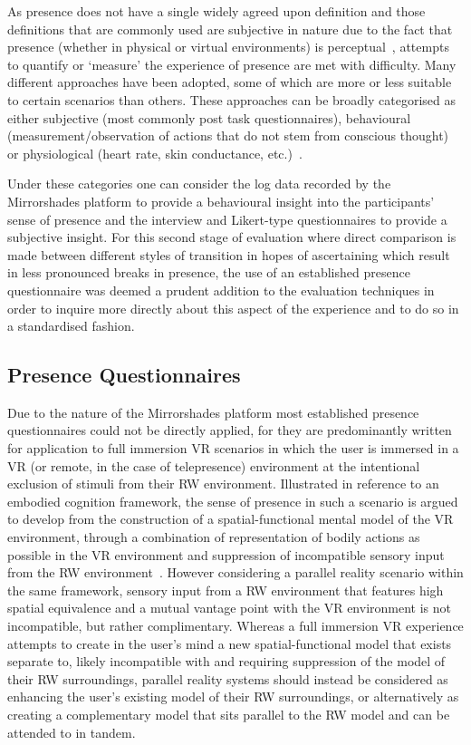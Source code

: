 As presence does not have a single widely agreed upon definition and those definitions that are commonly used are subjective in nature due to the fact that presence (whether in physical or virtual environments) is perceptual~\cite{Waterworth2014}, attempts to quantify or `measure' the experience of presence are met with difficulty. Many different approaches have been adopted, some of which are more or less suitable to certain scenarios than others. These approaches can be broadly categorised as either subjective (most commonly post task questionnaires), behavioural (measurement/observation of actions that do not stem from conscious thought) or physiological (heart rate, skin conductance, etc.)~\cite{Insko2003}.

Under these categories one can consider the log data recorded by the Mirrorshades platform to provide a behavioural insight into the participants' sense of presence and the interview and Likert-type questionnaires to provide a subjective insight. For this second stage of evaluation where direct comparison is made between different styles of transition in hopes of ascertaining which result in less pronounced breaks in presence, the use of an established presence questionnaire was deemed a prudent addition to the evaluation techniques in order to inquire more directly about this aspect of the experience and to do so in a standardised fashion.


\subsection{Presence Questionnaires}

Due to the nature of the Mirrorshades platform most established presence questionnaires could not be directly applied,  for they are predominantly written for application to full immersion VR scenarios in which the user is immersed in a VR (or remote, in the case of telepresence) environment at the intentional exclusion of stimuli from their RW environment. Illustrated in reference to an embodied cognition framework, the sense of presence in such a scenario is argued to develop from the construction of a spatial-functional mental model of the VR environment, through a combination of representation of bodily actions as possible in the VR environment and suppression of incompatible sensory input from the RW environment~\cite{Schubert2001}. However considering a parallel reality scenario within the same framework, sensory input from a RW environment that features high spatial equivalence and a mutual vantage point with the VR environment is not incompatible, but rather complimentary. Whereas a full immersion VR experience attempts to create in the user's mind a new spatial-functional model that exists separate to, likely incompatible with and requiring suppression of the model of their RW surroundings, parallel reality systems should instead be considered as enhancing the user's existing model of their RW surroundings, or alternatively as creating a complementary model that sits parallel to the RW model and can be attended to in tandem.

